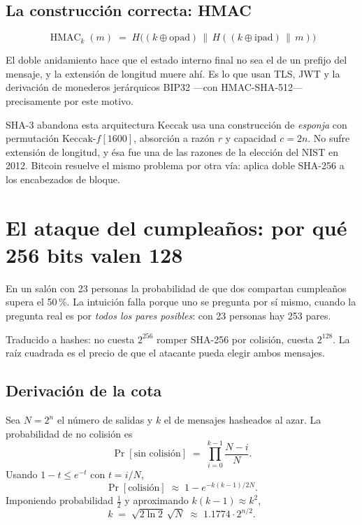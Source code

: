 \documentclass[11pt,a4paper]{article}
\theoremstyle{definition}
\theoremstyle{plain}
\theoremstyle{remark}
\newcommand{\concat}{\,\|\,}
\DeclareMathOperator{\HMAC}{HMAC}
\begin{document}
\subsection{La construcción correcta: HMAC}

\[
  \HMAC_k(m) \;=\; H\bigl((k \oplus \mathrm{opad}) \concat
                    H((k \oplus \mathrm{ipad}) \concat m)\bigr)
  \tag{RFC 2104}
\]

El doble anidamiento hace que el estado interno final no sea el de un prefijo del
mensaje, y la extensión de longitud muere ahí. Es lo que usan TLS, JWT y la
derivación de monederos jerárquicos BIP32 ---con HMAC-SHA-512--- precisamente por
este motivo.

\begin{nota}{SHA-3 abandona esta arquitectura}
Keccak usa una construcción de \emph{esponja} con permutación
$\text{Keccak-}f[1600]$, absorción a razón $r$ y capacidad $c = 2n$. No sufre
extensión de longitud, y ésa fue una de las razones de la elección del NIST en
2012. Bitcoin resuelve el mismo problema por otra vía: aplica doble SHA-256 a los
encabezados de bloque.
\end{nota}

\section{El ataque del cumpleaños: por qué 256 bits valen 128}

En un salón con 23 personas la probabilidad de que dos compartan cumpleaños
supera el 50\,\%. La intuición falla porque uno se pregunta por sí mismo, cuando
la pregunta real es por \emph{todos los pares posibles}: con 23 personas hay 253
pares.

Traducido a hashes: no cuesta $2^{256}$ romper SHA-256 por colisión, cuesta
$2^{128}$. La raíz cuadrada es el precio de que el atacante pueda elegir ambos
mensajes.

\subsection{Derivación de la cota}

Sea $N = 2^{n}$ el número de salidas y $k$ el de mensajes hasheados al azar. La
probabilidad de no colisión es
\[
  \Pr[\text{sin colisión}] \;=\; \prod_{i=0}^{k-1}\frac{N-i}{N}.
\]
Usando $1 - t \le e^{-t}$ con $t = i/N$,
\[
  \Pr[\text{colisión}] \;\approx\; 1 - e^{-k(k-1)/2N}.
\]
Imponiendo probabilidad $\tfrac12$ y aproximando $k(k-1)\approx k^{2}$,
\begin{equation}\label{eq:cumple}
  k \;=\; \sqrt{2\ln 2}\,\sqrt{N} \;\approx\; 1.1774\cdot 2^{n/2}.
\end{equation}
\end{document}
